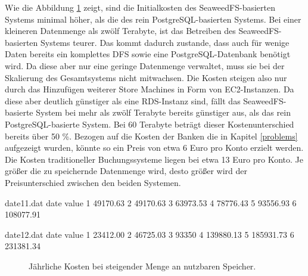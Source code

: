 \documentclass[12pt,oneside,a4paper,parskip]{scrbook}
\begin{document}
Wie die Abbildung \ref{costsAmazon} zeigt, sind die Initialkosten des SeaweedFS-basierten Systems minimal höher, als die des rein PostgreSQL-basierten Systems. Bei einer kleineren Datenmenge als zwölf Terabyte, ist das Betreiben des SeaweedFS-basierten Systems teurer. Das kommt dadurch zustande, dass auch für wenige Daten bereits ein komplettes DFS sowie eine PostgreSQL-Datenbank benötigt wird. Da diese aber nur eine geringe Datenmenge verwaltet, muss sie bei der Skalierung des Gesamtsystems nicht mitwachsen. Die Kosten steigen also nur durch das Hinzufügen weiterer Store Machines in Form von EC2-Instanzen. Da diese aber deutlich günstiger als eine RDS-Instanz sind, fällt das SeaweedFS-basierte System bei mehr als zwölf Terabyte bereits günstiger aus, als das rein PostgreSQL-basierte System. Bei 60 Terabyte beträgt dieser Kostenunterschied bereits über 50 \%. Bezogen auf die Kosten der Banken die in Kapitel \ref{problems} aufgezeigt wurden, könnte so ein Preis von etwa 6 Euro pro Konto erzielt werden. Die Kosten traditioneller Buchungssysteme liegen bei etwa 13 Euro pro Konto. Je größer die zu speichernde Datenmenge wird, desto größer wird der Preisunterschied zwischen den beiden Systemen.

\begin{filecontents}{date11.dat}
date  value
1     49170.63
2     49170.63
3     63973.53
4     78776.43
5     93556.93
6     108077.91
\end{filecontents}

\begin{filecontents}{date12.dat}
date  value
1     23412.00
2     46725.03
3     93350
4     139880.13
5     185931.73
6     231381.34
\end{filecontents}



\begin{figure}
\begin{center}
\caption[Jährliche Kosten bei steigender Menge an nutzbaren Speicher]{Jährliche Kosten bei steigender Menge an nutzbaren Speicher.}
\label{costsAmazon}
\end{center}
\end{figure}
\end{document}
